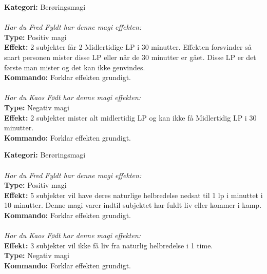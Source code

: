\begin{nvit*}
\textbf{Kategori:} Berøringsmagi\\
\\
\emph{\textit{Har du Fred Fyldt har denne magi effekten:}}\\
\textbf{Type:} Positiv magi\\ 
\textbf{Effekt:} 2 subjekter får 2 Midlertidige LP i 30 minutter. Effekten forsvinder så snart personen mister disse LP eller når de 30 minutter er gået. Disse LP er det første man mister og det kan ikke genvindes.\\
\textbf{Kommando:} Forklar effekten grundigt.\\
\\
\emph{\textit{Har du Kaos Født har denne magi effekten:}}\\
\textbf{Type:} Negativ magi\\ 
\textbf{Effekt:} 2 subjekter mister alt midlertidig LP og kan ikke få Midlertidig LP i 30 minutter.\\
\textbf{Kommando:} Forklar effekten grundigt.\\
\end{nvit*}

\begin{nvit*}
\textbf{Kategori:} Berøringsmagi\\    
\\
\emph{\textit{Har du Fred Fyldt har denne magi effekten:}}\\
\textbf{Type:} Positiv magi \\
\textbf{Effekt:} 5 subjekter vil have deres naturlige helbredelse nedsat til 1 lp i minuttet i 10 minutter. Denne magi varer indtil subjektet har fuldt liv eller kommer i kamp.\\
\textbf{Kommando:} Forklar effekten grundigt.\\
\\
\emph{\textit{Har du Kaos Født har denne magi effekten:}}\\
\textbf{Effekt:} 3 subjekter vil ikke få liv fra naturlig helbredelse i 1 time.\\
\textbf{Type:} Negativ magi \\
\textbf{Kommando:} Forklar effekten grundigt.\\
\end{nvit*}

